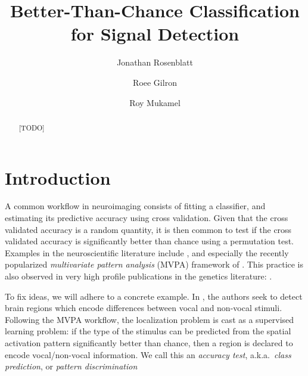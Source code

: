 \documentclass[12pt,a4paper]{article}
\author{Jonathan Rosenblatt \and Roee Gilron \and Roy Mukamel}
\title{Better-Than-Chance Classification for Signal Detection}
\theoremstyle{definition}
\begin{document}


\maketitle
\linenumbers

\begin{abstract}
[TODO]
\end{abstract}


\section{Introduction}
\label{sec:introduction}

A common workflow in neuroimaging consists of fitting a classifier, and estimating its predictive accuracy using cross validation. 
Given that the cross validated accuracy is a random quantity, it is then common to test if the cross validated accuracy is significantly better than chance using a permutation test.  
Examples in the neuroscientific literature include \citet{golland_permutation_2003,pereira_machine_2009,varoquaux_assessing_2016}, and especially the recently popularized \emph{multivariate pattern analysis} (MVPA) framework of \citet{kriegeskorte_information-based_2006}.
This practice is also observed in very high profile publications in the genetics literature: 
\citet{golub_molecular_1999,slonim_class_2000,radmacher_paradigm_2002,mukherjee_estimating_2003,juan_prediction_2004,jiang_calculating_2008}.


To fix ideas, we will adhere to a concrete example.
In \cite{gilron_quantifying_2016}, the authors seek to detect brain regions which encode differences between vocal and non-vocal stimuli. 
Following the MVPA workflow, the localization problem is cast as a supervised learning problem: if the type of the stimulus can be predicted from the spatial activation pattern significantly better than chance, then a region is declared to encode vocal/non-vocal information. 
We call this an \emph{accuracy test}, a.k.a.\ \emph{class prediction}, or \emph{pattern discrimination} 
\end{document}
